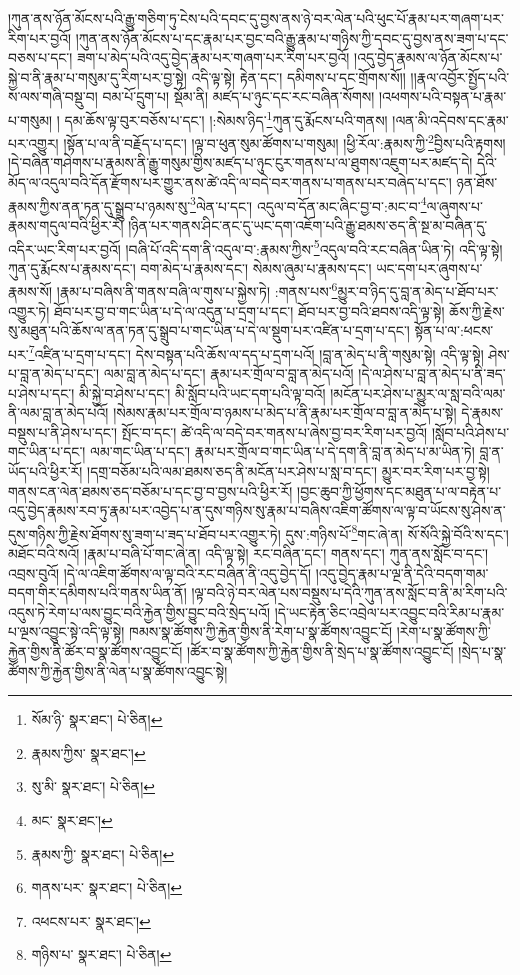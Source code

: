 །ཀུན་ནས་ཉོན་མོངས་པའི་རྒྱུ་གཅིག་ཏུ་ངེས་པའི་དབང་དུ་བྱས་ནས་ཉེ་བར་ལེན་པའི་ཕུང་པོ་རྣམ་པར་གཞག་པར་རིག་པར་བྱའོ། །ཀུན་ནས་ཉོན་མོངས་པ་དང་རྣམ་པར་བྱང་བའི་རྒྱུ་རྣམ་པ་གཉིས་ཀྱི་དབང་དུ་བྱས་ནས་ཟག་པ་དང་བཅས་པ་དང་། ཟག་པ་མེད་པའི་འདུ་བྱེད་རྣམ་པར་གཞག་པར་རིག་པར་བྱའོ། །འདུ་བྱེད་རྣམས་ལ་ཉོན་མོངས་པ་སྐྱེ་བ་ནི་རྣམ་པ་གསུམ་དུ་རིག་པར་བྱ་སྟེ། འདི་ལྟ་སྟེ། རྟེན་དང་། དམིགས་པ་དང་གྲོགས་སོ།། །།རྣལ་འབྱོར་སྤྱོད་པའི་ས་ལས་གཞི་བསྡུ་བ། བམ་པོ་དྲུག་པ། སྡོམ་ནི། མཛད་པ་ཉུང་དང་རང་བཞིན་སོགས། །འཕགས་པའི་བསྟན་པ་རྣམ་པ་གསུམ། །
དམ་ཆོས་ལྟ་བུར་བཅོས་པ་དང་། །:སེམས་ཉིད་\footnote{སོམ་ཉི་  སྣར་ཐང་།  པེ་ཅིན། }ཀུན་དུ་རྨོངས་པའི་གནས། །ལན་མི་འདེབས་དང་རྣམ་པར་འགྱུར། །སྟོན་པ་ལ་ནི་བརྗོད་པ་དང་། །ལྟ་བ་ཕུན་སུམ་ཚོགས་པ་གསུམ། །ཕྱི་རོལ་:རྣམས་ཀྱི་\footnote{རྣམས་ཀྱིས་  སྣར་ཐང་། }བྱིས་པའི་རྟགས། །དེ་བཞིན་གཤེགས་པ་རྣམས་ནི་རྒྱུ་གསུམ་གྱིས་མཛད་པ་ཉུང་ངུར་གནས་པ་ལ་ཐུགས་འཇུག་པར་མཛད་དེ། དེའི་མོད་ལ་འདུལ་བའི་དོན་རྫོགས་པར་གྱུར་ནས་ཚེ་འདི་ལ་བདེ་བར་གནས་པ་གནས་པར་བཞེད་པ་དང་། ཉན་ཐོས་རྣམས་ཀྱིས་ནན་ཏན་དུ་སྒྲུབ་པ་ཉམས་སུ་\footnote{སུ་མི་  སྣར་ཐང་།  པེ་ཅིན། }ལེན་པ་དང་། འདུལ་བ་དོན་མང་ཞིང་བྱ་བ་:མང་བ་\footnote{མང་  སྣར་ཐང་། }ལ་ཞུགས་པ་རྣམས་གདུལ་བའི་ཕྱིར་རོ། །ཉིན་པར་གནས་ཤིང་ནང་དུ་ཡང་དག་འཇོག་པའི་རྒྱུ་ཐམས་ཅད་ནི་སྔ་མ་བཞིན་དུ་འདིར་ཡང་རིག་པར་བྱའོ། །བཞི་པོ་འདི་དག་ནི་འདུལ་བ་:རྣམས་ཀྱིས་\footnote{རྣམས་ཀྱི་  སྣར་ཐང་།  པེ་ཅིན། }འདུལ་བའི་རང་བཞིན་ཡིན་ཏེ། འདི་ལྟ་སྟེ། ཀུན་དུ་རྨོངས་པ་རྣམས་དང་། བག་མེད་པ་རྣམས་དང་། སེམས་ཞུམ་པ་རྣམས་དང་། ཡང་དག་པར་ཞུགས་པ་རྣམས་སོ། །རྣམ་པ་བཞིས་ནི་གནས་བཞི་ལ་གུས་པ་སྐྱེས་ཏེ། :གནས་པས་\footnote{གནས་པར་  སྣར་ཐང་།  པེ་ཅིན། }མྱུར་བ་ཉིད་དུ་བླ་ན་མེད་པ་ཐོབ་པར་འགྱུར་ཏེ། ཐོབ་པར་བྱ་བ་གང་ཡིན་པ་དེ་ལ་འདུན་པ་དྲག་པ་དང་། ཐོབ་པར་བྱ་བའི་ཐབས་འདི་ལྟ་སྟེ། ཆོས་ཀྱི་རྗེས་སུ་མཐུན་པའི་ཆོས་ལ་ནན་ཏན་དུ་སྒྲུབ་པ་གང་ཡིན་པ་དེ་ལ་སྡུག་པར་འཛིན་པ་དྲག་པ་དང་། སྟོན་པ་ལ་:ཕངས་པར་\footnote{འཕངས་པར་  སྣར་ཐང་། }འཛིན་པ་དྲག་པ་དང་། དེས་བསྟན་པའི་ཆོས་ལ་དད་པ་དྲག་པའོ། །བླ་ན་མེད་པ་ནི་གསུམ་སྟེ། འདི་ལྟ་སྟེ། ཤེས་པ་བླ་ན་མེད་པ་དང་། ལམ་བླ་ན་མེད་པ་དང་། རྣམ་པར་གྲོལ་བ་བླ་ན་མེད་པའོ། །དེ་ལ་ཤེས་པ་བླ་ན་མེད་པ་ནི་ཟད་པ་ཤེས་པ་དང་། མི་སྐྱེ་བ་ཤེས་པ་དང་། མི་སློབ་པའི་ཡང་དག་པའི་ལྟ་བའོ། །མངོན་པར་ཤེས་པ་མྱུར་ལ་སླ་བའི་ལམ་ནི་ལམ་བླ་ན་མེད་པའོ། །སེམས་རྣམ་པར་གྲོལ་བ་ཉམས་པ་མེད་པ་ནི་རྣམ་པར་གྲོལ་བ་བླ་ན་མེད་པ་སྟེ། དེ་རྣམས་བསྡུས་པ་ནི་ཤེས་པ་དང་། སྤོང་བ་དང་། ཚེ་འདི་ལ་བདེ་བར་གནས་པ་ཞེས་བྱ་བར་རིག་པར་བྱའོ། །སློབ་པའི་ཤེས་པ་གང་ཡིན་པ་དང་། ལམ་གང་ཡིན་པ་དང་། རྣམ་པར་གྲོལ་བ་གང་ཡིན་པ་དེ་དག་ནི་བླ་ན་མེད་པ་མ་ཡིན་ཏེ། བླ་ན་ཡོད་པའི་ཕྱིར་རོ། །དགྲ་བཅོམ་པའི་ལམ་ཐམས་ཅད་ནི་མངོན་པར་ཤེས་པ་སླ་བ་དང་། མྱུར་བར་རིག་པར་བྱ་སྟེ། གནས་ངན་ལེན་ཐམས་ཅད་བཅོམ་པ་དང་བྱ་བ་བྱས་པའི་ཕྱིར་རོ། །བྱང་ཆུབ་ཀྱི་ཕྱོགས་དང་མཐུན་པ་ལ་བརྟེན་པ་འདུ་བྱེད་རྣམས་རབ་ཏུ་རྣམ་པར་འབྱེད་པ་ན་དུས་གཉིས་སུ་རྣམ་པ་བཞིས་འཇིག་ཚོགས་ལ་ལྟ་བ་ཡོངས་སུ་ཤེས་ན་དུས་གཉིས་ཀྱི་རྗེས་ཐོགས་སུ་ཟག་པ་ཟད་པ་ཐོབ་པར་འགྱུར་ཏེ། དུས་:གཉིས་པོ་\footnote{གཉིས་པ་  སྣར་ཐང་།  པེ་ཅིན། }གང་ཞེ་ན། སོ་སོའི་སྐྱེ་བོའི་ས་དང་། མཐོང་བའི་སའོ། །རྣམ་པ་བཞི་པོ་གང་ཞེ་ན། འདི་ལྟ་སྟེ། རང་བཞིན་དང་། གནས་དང་། ཀུན་ནས་སློང་བ་དང་། འབྲས་བུའོ། །དེ་ལ་འཇིག་ཚོགས་ལ་ལྟ་བའི་རང་བཞིན་ནི་འདུ་བྱེད་དོ། །འདུ་བྱེད་རྣམ་པ་ལྔ་ནི་དེའི་བདག་གམ་བདག་གིར་དམིགས་པའི་གནས་ཡིན་ནོ། །ལྟ་བའི་ཉེ་བར་ལེན་པས་བསྡུས་པ་དེའི་ཀུན་ནས་སློང་བ་ནི་མ་རིག་པའི་འདུས་ཏེ་རེག་པ་ལས་བྱུང་བའི་རྐྱེན་གྱིས་བྱུང་བའི་སྲེད་པའོ། །དེ་ཡང་རྟེན་ཅིང་འབྲེལ་པར་འབྱུང་བའི་རིམ་པ་རྣམ་པ་ལྔས་འབྱུང་སྟེ་འདི་ལྟ་སྟེ། ཁམས་སྣ་ཚོགས་ཀྱི་རྐྱེན་གྱིས་ནི་རེག་པ་སྣ་ཚོགས་འབྱུང་ངོ། །རེག་པ་སྣ་ཚོགས་ཀྱི་རྐྱེན་གྱིས་ནི་ཚོར་བ་སྣ་ཚོགས་འབྱུང་ངོ། །ཚོར་བ་སྣ་ཚོགས་ཀྱི་རྐྱེན་གྱིས་ནི་སྲེད་པ་སྣ་ཚོགས་འབྱུང་ངོ། །སྲེད་པ་སྣ་ཚོགས་ཀྱི་རྐྱེན་གྱིས་ནི་ལེན་པ་སྣ་ཚོགས་འབྱུང་སྟེ། 